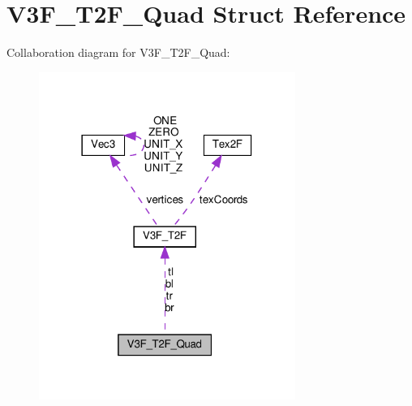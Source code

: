 \hypertarget{structV3F__T2F__Quad}{}\section{V3\+F\+\_\+\+T2\+F\+\_\+\+Quad Struct Reference}
\label{structV3F__T2F__Quad}


Collaboration diagram for V3\+F\+\_\+\+T2\+F\+\_\+\+Quad\+:
\nopagebreak
\begin{figure}[H]
\begin{center}
\leavevmode
\includegraphics[width=237pt]{structV3F__T2F__Quad__coll__graph}
\end{center}
\end{figure}
